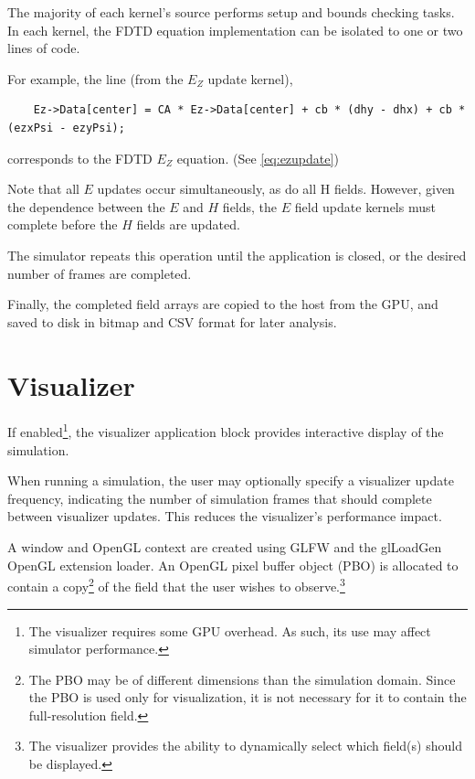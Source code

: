 The majority of each kernel's source performs setup and bounds checking tasks. In each kernel, the FDTD equation implementation can be isolated to one or two lines of code.

For example, the line (from the $E_Z$ update kernel),

\begin{lstlisting}
	Ez->Data[center] = CA * Ez->Data[center] + cb * (dhy - dhx) + cb * (ezxPsi - ezyPsi);
\end{lstlisting}

corresponds to the FDTD $E_Z$ equation. (See \autoref{eq:ezupdate})

\label{listing:updateHxCpp}

\label{listing:updateHyCpp}

Note that all $E$ updates occur simultaneously, as do all H fields. However, given the dependence between the $E$ and $H$ fields, the $E$ field update kernels must complete before the $H$ fields are updated.

The simulator repeats this operation until the application is closed, or the desired number of frames are completed. 

Finally, the completed field arrays are copied to the host from the GPU, and saved to disk in bitmap and CSV format for later analysis. 

\section{Visualizer}\label{sec:visualizer}

If enabled\footnote{The visualizer requires some GPU overhead. As such, its use may affect simulator performance. }, the visualizer application block provides interactive display of the simulation. 

When running a simulation, the user may optionally specify a visualizer update frequency, indicating the number of simulation frames that should complete between visualizer updates. This reduces the visualizer's performance impact.

A window and OpenGL context are created using GLFW and the glLoadGen OpenGL extension loader. An OpenGL pixel buffer object (PBO) is allocated to contain a copy\footnote{The PBO may be of different dimensions than the simulation domain. Since the PBO is used only for visualization, it is not necessary for it to contain the full-resolution field.} of the field that the user wishes to observe.\footnote{The visualizer provides the ability to dynamically select which field(s) should be displayed.} 

